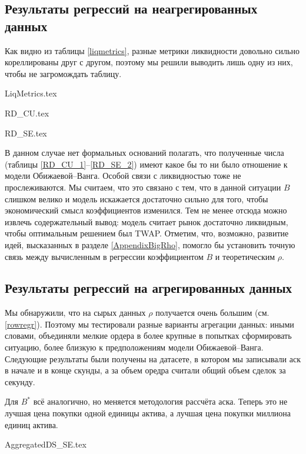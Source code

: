 \subsection{Результаты регрессий на неагрегированных данных}
Как видно из таблицы \ref{liqmetrics}, разные метрики ликвидности довольно сильно кореллированы друг с другом, поэтому 
мы решили выводить лишь одну из них, чтобы не загромождать таблицу.
\par
{LiqMetrics.tex}

{RD_CU.tex}

{RD_SE.tex}


В данном случае нет формальных оснований полагать, что полученные числа 
(таблицы \ref{RD_CU_1}--\ref{RD_SE_2}) имеют какое бы то ни было отношение к модели 
Обижаевой--Ванга. Особой связи с ликвидностью тоже не прослеживаются. Мы считаем, что это связано с тем, 
что в данной ситуации $B$ слишком велико и модель искажается достаточно сильно для того, 
чтобы экономический смысл коэффициентов изменился. Тем не менее отсюда можно извлечь содержательный вывод:
модель считает рынок достаточно ликвидным, чтобы оптимальным решением был TWAP. 
Отметим, что, возможно, развитие идей, высказанных в разделе \ref{AppendixBigRho}, 
помогло бы установить точную связь между вычисленным в регрессии
коэффициентом $B$ и теоретическим $\rho$. 


\subsection{Результаты регрессий на агрегированных данных}
Мы обнаружили, что на сырых данных $\rho$ получается очень большим (см. \ref{rowregr}). Поэтому мы тестировали разные
варианты агрегации данных: иными словами, объединяли мелкие ордера в более крупные в попытках сформировать ситуацию,
более близкую к предположениям модели Обижаевой--Ванга. Следующие результаты были получены на датасете, в котором мы 
записывали аск в начале и в конце скунды, а за объем оредра считали общий объем сделок за секунду.
\par
Для $B ^*$ всё аналогично, но меняется методология рассчёта аска. Теперь это не лучшая цена покупки
одной единицы актива, а лучшая цена покупки миллиона единиц актива. \par

{AggregatedDS_SE.tex}

